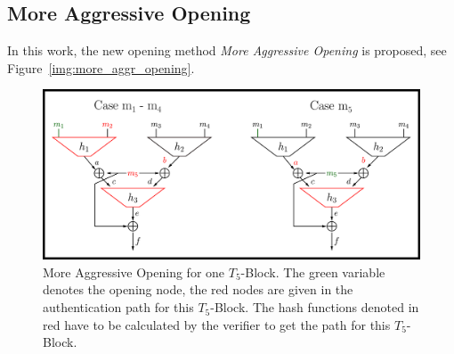 \subsection{More Aggressive Opening}
\label{sec:more_aggr_opening}
In this work, the new opening method \textit{More Aggressive Opening} is proposed, see Figure~\ref{img:more_aggr_opening}. 

\begin{figure}
\centering
\includegraphics[]{images/Methods/more_aggr_opening.png}
\caption{More Aggressive Opening for one $T_5$-Block. The green variable denotes the opening node, the red nodes are given in the authentication path for this $T_5$-Block. The hash functions denoted in red have to be calculated by the verifier to get the path for this $T_5$-Block.}
\label{img:t5_more_aggr_opening}
\end{figure}

%

